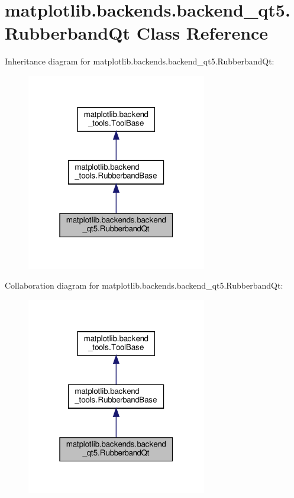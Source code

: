 \hypertarget{classmatplotlib_1_1backends_1_1backend__qt5_1_1RubberbandQt}{}\section{matplotlib.\+backends.\+backend\+\_\+qt5.\+Rubberband\+Qt Class Reference}
\label{classmatplotlib_1_1backends_1_1backend__qt5_1_1RubberbandQt}


Inheritance diagram for matplotlib.\+backends.\+backend\+\_\+qt5.\+Rubberband\+Qt\+:
\nopagebreak
\begin{figure}[H]
\begin{center}
\leavevmode
\includegraphics[width=223pt]{classmatplotlib_1_1backends_1_1backend__qt5_1_1RubberbandQt__inherit__graph}
\end{center}
\end{figure}


Collaboration diagram for matplotlib.\+backends.\+backend\+\_\+qt5.\+Rubberband\+Qt\+:
\nopagebreak
\begin{figure}[H]
\begin{center}
\leavevmode
\includegraphics[width=223pt]{classmatplotlib_1_1backends_1_1backend__qt5_1_1RubberbandQt__coll__graph}
\end{center}
\end{figure}

